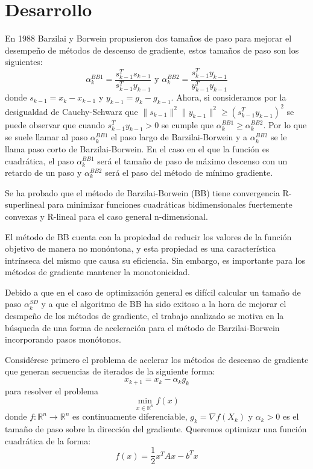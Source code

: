 \section*{Desarrollo}
En 1988 Barzilai y Borwein propusieron dos tamaños de paso para mejorar el desempeño de métodos de descenso de gradiente, estos tamaños de paso son los siguientes:
$$
\alpha^{BB1}_k = \frac{s^T_{k-1}s_{k-1}}{s^T_{k-1}y_{k-1}} \text{ y } \alpha_k^{BB2} = \frac{s_{k-1}^Ty_{k-1}}{y_{k-1}^Ty_{k-1}}
$$
donde $s_{k-1} = x_k - x_{k-1}$ y $y_{k-1} = g_k - g_{k-1}$. Ahora, si consideramos por la desigualdad de Cauchy-Schwarz que $\|s_{k-1}\|^2\|y_{k-1}\|^2 \geq (s_{k-1}^Ty_{k-1})^2$ se puede observar que cuando $s_{k-1}^Ty_{k-1}>0$ se cumple que $\alpha_k^{BB1} \geq \alpha_k^{BB2}$. Por lo que se suele llamar al paso $\alpha_k^{BB1}$ el paso largo de Barzilai-Borwein y a $\alpha_k^{BB2}$ se le llama paso corto de Barzilai-Borwein. En el caso en el que la función es cuadrática, el paso $\alpha_k^{BB1}$ será el tamaño de paso de máximo descenso con un retardo de un paso y $\alpha_k^{BB2}$ será el paso del método de mínimo gradiente.
\par Se ha probado que el método de Barzilai-Borwein (BB) tiene convergencia R-superlineal para minimizar funciones cuadráticas bidimensionales fuertemente convexas y R-lineal para el caso general n-dimensional.
\par El método de BB cuenta con la propiedad de reducir los valores de la función objetivo de manera no monóntona, y esta propiedad es una característica intrínseca del mismo que causa su eficiencia. Sin embargo, es importante para los métodos de gradiente mantener la monotonicidad.
\par Debido a que en el caso de optimización general es difícil calcular un tamaño de paso $\alpha_k^{SD}$ y a que el algoritmo de BB ha sido exitoso a la hora de mejorar el desmpeño de los métodos de gradiente, el trabajo analizado se motiva en la búsqueda de una forma de aceleración para el método de Barzilai-Borwein incorporando pasos monótonos. 
\par Considérese primero el problema de acelerar los métodos de descenso de gradiente que generan secuencias de iterados de la siguiente forma:
$$
	x_{k+1} = x_k - \alpha_kg_k
$$
para resolver el problema 
$$
	\min_{x\in\mathbb{R}^n}f(x)
$$
donde $f:\mathbb{R}^n \rightarrow \mathbb{R}^n$ es continuamente diferenciable, $g_k=\nabla f(X_k)$ y $\alpha_k>0$ es el tamaño de paso sobre la dirección del gradiente.
Queremos optimizar una función cuadrática de la forma:
$$
	f(x) = \frac{1}{2}x^TAx- b^Tx
$$
